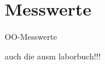 \newpage

\onecolumn

\appendix

\section{Messwerte}
\label{sec:messwerte}
OO-Messwerte

auch die ausm laborbuch!!!